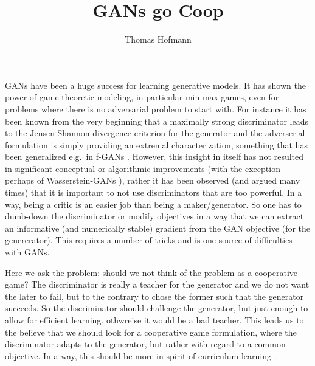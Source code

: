 \documentclass[12pt,a4paper]{article}
\author{Thomas Hofmann}
\title{GANs go Coop}
\begin{document}
\maketitle

\noindent 

GANs have been a huge success for learning generative models. It has shown the power of game-theoretic modeling, in particular min-max games, even for problems where there is no adversarial problem to start with. For instance it has been known from the very beginning \cite{goodfellow2014generative} that  a maximally strong discriminator leads to the Jensen-Shannon divergence criterion for the generator and the adverserial formulation is simply providing an extremal characterization, something that has been generalized e.g.~in f-GANs \cite{nowozin2016f}.  However, this insight in itself has not resulted in significant conceptual or algorithmic improvements (with the execption perhaps of Wasserstein-GANs \cite{arjovsky2017wasserstein}), rather it has been observed (and argued many times) that it is important to not use discriminators that are too powerful.  In a way, being a critic is an easier job than being a maker/generator. So one has to dumb-down the discriminator or modify objectives in a way that we can extract an informative (and numerically stable) gradient from the GAN objective (for the genererator). This requires a number of tricks and  is one source of difficulties with GANs.


Here we ask the problem: should we not think of the problem as a cooperative game? The discriminator is really a teacher for the generator and we do not want the later to fail, but to the contrary to chose the former such that the generator succeeds. So the discriminator should challenge the generator, but just enough to allow for efficient learning. othwreise it would be a bad teacher. This leads us to the believe that we should look for a cooperative game formulation, where the discriminator adapts to the generator, but rather with regard to a common objective. In a way, this should be more in spirit of curriculum learning  \cite{bengio2009curriculum}. \\
\end{document}

